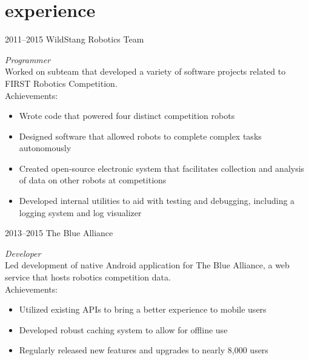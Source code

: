 \documentclass[]{resume}
\begin{document}

\section{experience}


\begin{entrylist}


\entry
{2011--2015}
{WildStang Robotics Team}
{}
{\emph{Programmer} \\
Worked on subteam that developed a variety of software projects related to FIRST Robotics Competition. \\
Achievements:
\noindent\begin{itemize}[leftmargin=0.45cm]
\item Wrote code that powered four distinct competition robots
\item Designed software that allowed robots to complete complex tasks autonomously
\item Created open-source electronic system that facilitates collection and analysis of data on other robots at competitions
\item Developed internal utilities to aid with testing and debugging, including a logging system and log visualizer
\end{itemize}}


\entry
{2013--2015}
{The Blue Alliance}
{}
{\emph{Developer} \\
Led development of native Android application for The Blue Alliance, a web service that hosts robotics competition data. \\
Achievements:
\noindent\begin{itemize}[leftmargin=0.45cm]
\item Utilized existing APIs to bring a better experience to mobile users
\item Developed robust caching system to allow for offline use
\item Regularly released new features and upgrades to nearly 8,000 users
\end{itemize}}

\end{entrylist}
\end{document}
